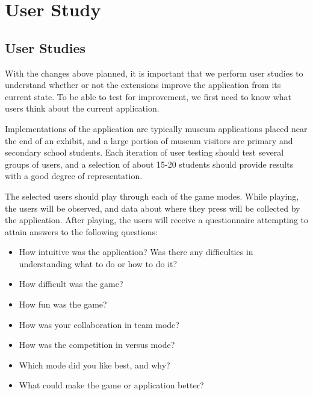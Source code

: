 
\chapter{User Study}

\label{Chapter4}



\section{User Studies}

With the changes above planned, it is important that we perform user studies to understand whether or not the extensions improve the application from its current state. To be able to test for improvement, we first need to know what users think about the current application.

Implementations of the application are typically museum applications placed near the end of an exhibit, and a large portion of museum visitors are primary and secondary school students. Each iteration of user testing should test several groups of users, and a selection of about 15-20 students should provide results with a good degree of representation.

The selected users should play through each of the game modes. While playing, the users will be observed, and data about where they press will be collected by the application. After playing, the users will receive a questionnaire attempting to attain answers to the following questions:

\begin{itemize}
	\item How intuitive was the application? Was there any difficulties in understanding what to do or how to do it?
	\item How difficult was the game?
	\item How fun was the game?
	\item How was your collaboration in team mode?
	\item How was the competition in versus mode?
	\item Which mode did you like best, and why?
	\item What could make the game or application better?
\end{itemize}


